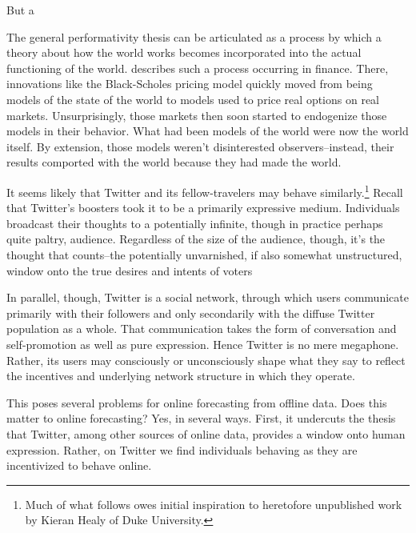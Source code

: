 \documentclass{article}
\begin{document}

But a

The general performativity thesis can be articulated as a process by
which a theory about how the world works becomes incorporated into the
actual functioning of the world. \cite{mackenzie2006engine} describes
such a process occurring in finance. There, innovations like the
Black-Scholes pricing model quickly moved from being models of the
state of the world to models used to price real options on real
markets. Unsurprisingly, those markets then soon started to endogenize
those models in their behavior. What had been models of the world were
now the world itself. By extension, those models weren't disinterested
observers--instead, their results comported with the world because
they had made the world. 

It seems likely that Twitter and its fellow-travelers may behave
similarly.\footnote{Much of what follows owes initial inspiration to
  heretofore unpublished work by Kieran Healy of Duke University.}
Recall that Twitter's boosters took it to be a primarily expressive
medium. Individuals broadcast their thoughts to a potentially
infinite, though in practice perhaps quite paltry,
audience. Regardless of the size of the audience, though, it's the
thought that counts--the potentially unvarnished, if also somewhat
unstructured, window onto the true desires and intents of voters

In parallel, though, Twitter is a social network, through which users
communicate primarily with their followers and only secondarily with
the diffuse Twitter population as a whole. That communication takes
the form of conversation and self-promotion as well as pure
expression. Hence Twitter is no mere megaphone. Rather, its users may
consciously or unconsciously shape what they say to reflect the
incentives and underlying network structure in which they operate. 

This poses several problems for online forecasting from offline data. 
Does this matter to online forecasting? Yes, in several ways. First,
it undercuts the thesis that Twitter, among other sources of online
data, provides a window onto human expression. Rather, on Twitter we
find individuals behaving as they are incentivized to
behave online. 
\end{document}
